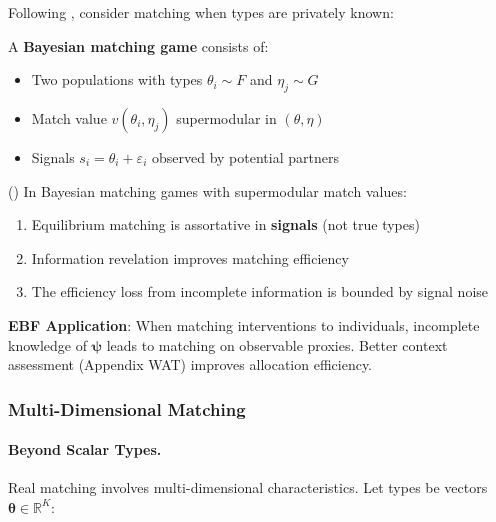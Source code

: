 Following \citet{johnson2019matching}, consider matching when types are privately known:

\begin{definition}
\label{def:bayesian-matching}
A \textbf{Bayesian matching game} consists of:
\begin{itemize}
    \item Two populations with types $\theta_i \sim F$ and $\eta_j \sim G$
    \item Match value $v(\theta_i, \eta_j)$ supermodular in $(\theta, \eta)$
    \item Signals $s_i = \theta_i + \varepsilon_i$ observed by potential partners
\end{itemize}
\end{definition}

\begin{theorem}
\label{thm:uncertain-matching}
\textup{(\citet{johnson2019matching})}
In Bayesian matching games with supermodular match values:
\begin{enumerate}
    \item Equilibrium matching is assortative in \textbf{signals} (not true types)
    \item Information revelation improves matching efficiency
    \item The efficiency loss from incomplete information is bounded by signal noise
\end{enumerate}
\end{theorem}

\textbf{EBF Application}: When matching interventions to individuals, incomplete 
knowledge of $\boldsymbol{\psi}$ leads to matching on observable proxies. Better 
context assessment (Appendix WAT) improves allocation efficiency.

\subsubsection{Multi-Dimensional Matching}

\paragraph{Beyond Scalar Types.}

Real matching involves multi-dimensional characteristics. Let types be vectors 
$\boldsymbol{\theta} \in \mathbb{R}^K$:

